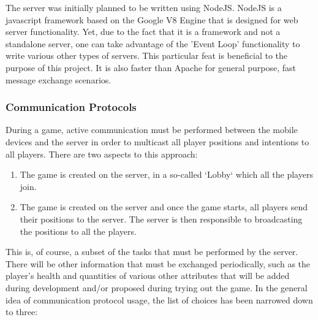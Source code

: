 \documentclass{article}
\begin{document}
The server was initially planned to be written using NodeJS\cite{nodejs}. NodeJS
is a javascript framework based on the Google V8 Engine that is designed for web
server functionality. Yet, due to the fact that it is a framework and not a
standalone server, one can take advantage of the 'Event Loop' functionality to
write various other types of servers. This particular feat is beneficial to the
purpose of this project. It is also faster than Apache for general purpose, fast
message exchange scenarios\cite{nodejsvsapache}.

\subsubsection{Communication Protocols}
During a game, active communication must be performed between the mobile devices
and the server in order to multicast all player positions and intentions to all
players. There are two aspects to this approach:

\begin{enumerate}
	\item The game is created on the server, in a so-called `Lobby` which all the
	players join.
	\item The game is created on the server and once the game starts, all players send
	their positions to the server. The server is then responsible to broadcasting
	the positions to all the players.
\end{enumerate}

This is, of course, a subset of the tasks that must be performed by the server.
There will be other information that must be exchanged periodically, such as the
player's health and quantities of various other attributes that will be added
during development and/or proposed during trying out the game. In the general
idea of communication protocol usage, the list of choices has been narrowed down
to three:
\end{document}
